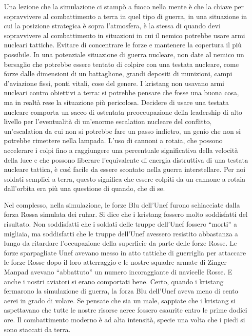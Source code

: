 Una lezione che la simulazione ci stampò a fuoco nella mente è che la
chiave per sopravvivere al combattimento a terra in quel tipo di guerra,
in una situazione in cui la posizione strategica è sopra l'atmosfera, è
la stessa di quando devi sopravvivere al combattimento in situazioni in
cui il nemico potrebbe usare armi nucleari tattiche. Evitare di
concentrare le forze e mantenere la copertura il più possibile. In una
potenziale situazione di guerra nucleare, non date al nemico un
bersaglio che potrebbe essere tentato di colpire con una testata
nucleare, come forze dalle dimensioni di un battaglione, grandi depositi
di munizioni, campi d'aviazione fissi, ponti vitali, cose del genere. I
kristang non usavano armi nucleari contro obiettivi a terra: si potrebbe
pensare che fosse una buona cosa, ma in realtà rese la situazione più
pericolosa. Decidere di usare una testata nucleare comporta un sacco di
ostentata preoccupazione della leadership di alto livello per
l'eventualità di un'enorme escalation nucleare del conflitto,
un'escalation da cui non si potrebbe fare un passo indietro, un genio
che non si potrebbe rimettere nella lampada. L'uso di cannoni a rotaia,
che possono accelerare i colpi fino a raggiungere una percentuale
significativa della velocità della luce e che possono liberare
l'equivalente di energia distruttiva di una testata nucleare tattica, è
così facile da essere scontato nella guerra interstellare. Per noi
soldati semplici a terra, questo significa che essere colpiti da un
cannone a rotaia dall'orbita era più una questione di quando, che di se.

Nel complesso, nella simulazione, le forze Blu dell'Unef furono
schiacciate dalla forza Rossa simulata dei ruhar. Si dice che i kristang
fossero molto soddisfatti del risultato. Non soddisfatti che i soldati
delle truppe dell'Unef fossero ``morti'' a migliaia, ma soddisfatti che
le truppe dell'Unef avessero resistito abbastanza a lungo da ritardare
l'occupazione della superficie da parte delle forze Rosse. Le forze
sparpagliate Unef avevano messo in atto tattiche di guerriglia per
attaccare le forze Rosse dopo il loro atterraggio e le nostre squadre
armate di Zinger Manpad avevano ``abbattuto'' un numero incoraggiante di
navicelle Rosse. E anche i nostri aviatori si erano comportati bene.
Certo, quando i kristang fermarono la simulazione di guerra, la forza
Blu dell'Unef aveva meno di cento aerei in grado di volare. Se pensate
che sia un male, sappiate che i kristang si aspettavano che tutte le
nostre risorse aeree fossero esaurite entro le prime dodici ore. Il
combattimento moderno è ad alta intensità, specie una volta che i piedi
si sono staccati da terra.

